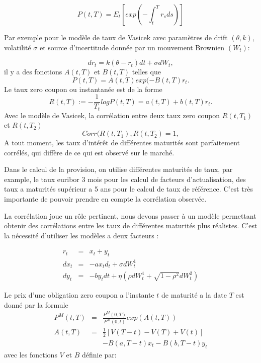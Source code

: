 \documentclass[12pt, a4paper]{book}
\begin{document}
$$ P(t,T) = E_t \left[ exp\left( -\int_t^T r_s ds \right)\right]$$

Par exemple pour le modèle de taux de Vasicek avec paramètres de drift $(\theta, k)$, volatilité $\sigma$ et source d'incertitude donnée par un mouvement Brownien $(W_t)$: 

$$ dr_t = k(\theta -r_t)dt +\sigma dW_t,$$
il y a des fonctions $A(t,T)$ et $B(t,T)$ telles que
$$P(t,T) = A(t,T)exp(-B(t,T)r_t.$$
Le taux zero coupon ou instantanée est de la forme
$$R(t,T) := -\frac{1}{T_t}log P(t,T)= a(t,T)+b(t,T)r_t.$$
Avec le modèle de Vasicek, la corrélation entre deux taux zero coupon $R(t,T_1)$ et $R(t,T_2)$
$$Corr(R(t,T_1), R(t,T_2) = 1,$$
A tout moment, les taux d'intérêt de différentes maturités sont parfaitement corrélés, qui diffère de ce qui est observé sur le marché.

Dans le calcul de la provision, on utilise différentes maturités de taux, par example, le taux euribor 3 mois pour les calcul de facteurs d'actualisation, des taux a maturités supérieur a 5 ans pour le calcul de taux de référence. C'est très importante de pouvoir prendre en compte la corrélation observée.

La corrélation joue un rôle pertinent, nous devons passer à un modèle permettant obtenir des corrélations entre les taux de différentes maturités plus réalistes. C'est la nécessité d'utiliser les modèles a deux facteurs :

\begin{eqnarray}
r_t &=& x_t + y_t\nonumber\\
dx_t &=& -ax_td_t +\sigma dW_t^1\nonumber\\
dy_t &=& -by_t dt +\eta (\rho dW_t^1 +\sqrt{1-\rho ^2}d W_t^2) \nonumber
\end{eqnarray}

Le prix d'une obligation zero coupon a l'instante $t$ de maturité a la date $T$ est donné par la formule
\begin{eqnarray}
P^M(t,T) &=&\frac{P^M(0,T)}{P^M(0,t)}exp(A(t,T))\label{PtT}\\ 
A(t,T) &=& \frac{1}{2}[V(T-t)-V(T)+V(t)] \nonumber\\
	   & & -B(a, T-t)x_t  -B(b,T-t)y_t\nonumber
\end{eqnarray}
avec les fonctions $V$ et $B$ définie par:
\end{document}
